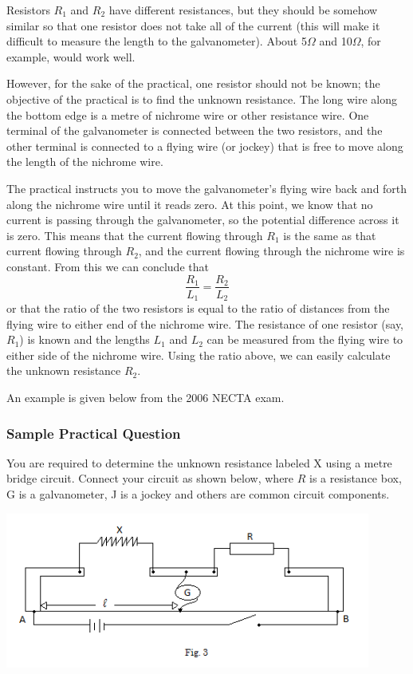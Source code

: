 Resistors $R_1$ and $R_2$ have different resistances, but they should be somehow similar so
that one resistor does not take all of the current (this will make it difficult to measure the
length to the galvanometer). About 5$\Omega$ and 10$\Omega$, for example, would work well.

However, for the sake of the practical, one resistor should not be known; the objective of
the practical is to find the unknown resistance. The long wire along the bottom edge is a
metre of nichrome wire or other resistance wire. One terminal of the galvanometer is
connected between the two resistors, and the other terminal is connected to a flying wire (or jockey)
that is free to move along the length of the nichrome wire.

The practical instructs you to move the galvanometer's flying wire back and forth
along the nichrome wire until it reads zero. At this point, we know that no current is
passing through the galvanometer, so the potential difference across it is zero. This
means that the current flowing through $R_1$ is the same as that current flowing through $R_2$,
and the current flowing through the nichrome wire is constant. From this we can
conclude that
$$ \frac{R_1}{L_1} = \frac{R_2}{L_2} $$
or that the ratio of the two resistors is equal to the ratio of distances from the flying wire
to either end of the nichrome wire. The resistance of one resistor (say, $R_1$) is known and
the lengths $L_1$ and $L_2$ can be measured from the flying wire to either side of the
nichrome wire. Using the ratio above, we can easily calculate the unknown resistance $R_2$.

An example is given below from the 2006 NECTA exam.

\subsubsection{Sample Practical Question}
You are required to determine the unknown resistance labeled X using a metre bridge circuit. Connect your circuit as shown below, where $R$ is a resistance box, G is a galvanometer, J is a jockey and others are common circuit components.

\begin{center}
\includegraphics[width=12cm]{./img/2006-3-alt.png}
\end{center}

